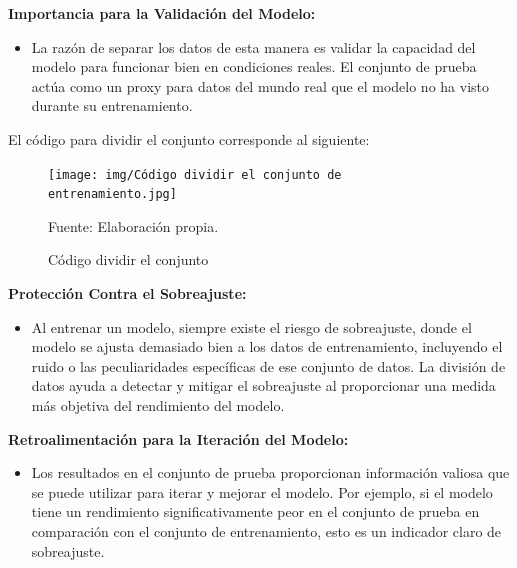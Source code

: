 \textbf{Importancia para la Validación del Modelo:}

\begin{itemize}
    \item La razón de separar los datos de esta manera es validar la capacidad del modelo para funcionar bien en condiciones reales. El conjunto de prueba actúa como un proxy para datos del mundo real que el modelo no ha visto durante su entrenamiento.
\end{itemize}

El código para dividir el conjunto corresponde al siguiente:

\begin{figure}[H]
    \begin{minipage}[t]{0.9\textwidth}
        \caption{Código dividir el conjunto}
        \label{dividir_conjunto}        
    \end{minipage}

    \vspace{10pt}

    \begin{minipage}[b]{1\textwidth}
        \centering
        \texttt{[image: img/Código dividir el conjunto de entrenamiento.jpg]}        
    \end{minipage}

    \begin{minipage}[t]{0.9\textwidth}
        Fuente: Elaboración propia.
    \end{minipage}
\end{figure}

\textbf{Protección Contra el Sobreajuste:}

\begin{itemize}
    \item Al entrenar un modelo, siempre existe el riesgo de sobreajuste, donde el modelo se ajusta demasiado bien a los datos de entrenamiento, incluyendo el ruido o las peculiaridades específicas de ese conjunto de datos. La división de datos ayuda a detectar y mitigar el sobreajuste al proporcionar una medida más objetiva del rendimiento del modelo.
\end{itemize}

\textbf{Retroalimentación para la Iteración del Modelo:}

\begin{itemize}
    \item Los resultados en el conjunto de prueba proporcionan información valiosa que se puede utilizar para iterar y mejorar el modelo. Por ejemplo, si el modelo tiene un rendimiento significativamente peor en el conjunto de prueba en comparación con el conjunto de entrenamiento, esto es un indicador claro de sobreajuste.
\end{itemize}


